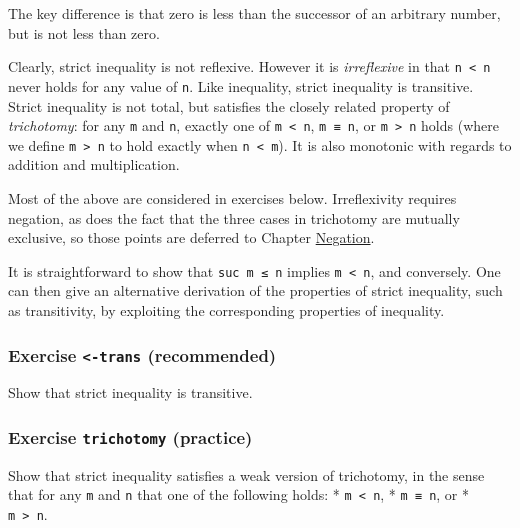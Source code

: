 The key difference is that zero is less than the successor of an
arbitrary number, but is not less than zero.

Clearly, strict inequality is not reflexive. However it is
\emph{irreflexive} in that \texttt{n\ \textless{}\ n} never holds for
any value of \texttt{n}. Like inequality, strict inequality is
transitive. Strict inequality is not total, but satisfies the closely
related property of \emph{trichotomy}: for any \texttt{m} and
\texttt{n}, exactly one of \texttt{m\ \textless{}\ n}, \texttt{m\ ≡\ n},
or \texttt{m\ \textgreater{}\ n} holds (where we define
\texttt{m\ \textgreater{}\ n} to hold exactly when
\texttt{n\ \textless{}\ m}). It is also monotonic with regards to
addition and multiplication.

Most of the above are considered in exercises below. Irreflexivity
requires negation, as does the fact that the three cases in trichotomy
are mutually exclusive, so those points are deferred to Chapter
\protect\hyperlink{Negation}{Negation}.

It is straightforward to show that \texttt{suc\ m\ ≤\ n} implies
\texttt{m\ \textless{}\ n}, and conversely. One can then give an
alternative derivation of the properties of strict inequality, such as
transitivity, by exploiting the corresponding properties of inequality.

\hypertarget{Relations-less-trans}{%
\subsubsection{\texorpdfstring{Exercise \texttt{\textless{}-trans}
(recommended)}{Exercise \textless-trans (recommended)}}\label{Relations-less-trans}}

Show that strict inequality is transitive.

\begin{fence}
\begin{code}%
\>[0]\<%
\end{code}
\end{fence}

\hypertarget{Relations-trichotomy}{%
\subsubsection{\texorpdfstring{Exercise \texttt{trichotomy}
(practice)}{Exercise trichotomy (practice)}}\label{Relations-trichotomy}}

Show that strict inequality satisfies a weak version of trichotomy, in
the sense that for any \texttt{m} and \texttt{n} that one of the
following holds: * \texttt{m\ \textless{}\ n}, * \texttt{m\ ≡\ n}, or *
\texttt{m\ \textgreater{}\ n}.

